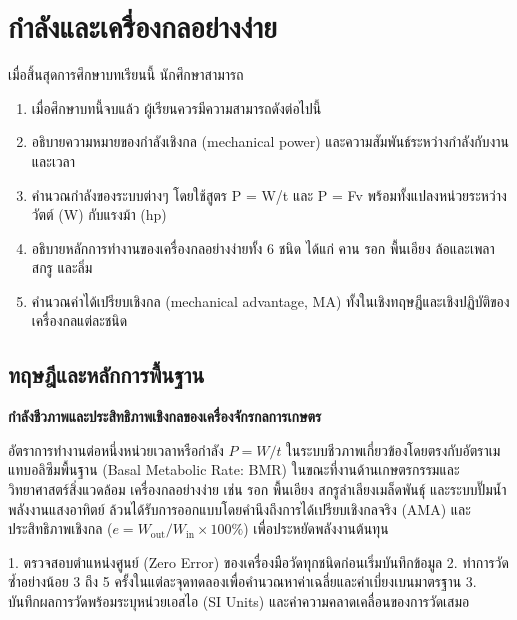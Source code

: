 \chapter{กำลังและเครื่องกลอย่างง่าย}
\label{ch:ch08_power_simple_machines}

\begin{conceptbox}[title=วัตถุประสงค์การเรียนรู้ประจำบท]
เมื่อสิ้นสุดการศึกษาบทเรียนนี้ นักศึกษาสามารถ
\begin{enumerate}
    \item เมื่อศึกษาบทนี้จบแล้ว ผู้เรียนควรมีความสามารถดังต่อไปนี้
    \item อธิบายความหมายของกำลังเชิงกล (mechanical power) และความสัมพันธ์ระหว่างกำลังกับงานและเวลา
    \item คำนวณกำลังของระบบต่างๆ โดยใช้สูตร P = W/t และ P = Fv พร้อมทั้งแปลงหน่วยระหว่างวัตต์ (W) กับแรงม้า (hp)
    \item อธิบายหลักการทำงานของเครื่องกลอย่างง่ายทั้ง 6 ชนิด ได้แก่ คาน รอก พื้นเอียง ล้อและเพลา สกรู และลิ่ม
    \item คำนวณค่าได้เปรียบเชิงกล (mechanical advantage, MA) ทั้งในเชิงทฤษฎีและเชิงปฏิบัติของเครื่องกลแต่ละชนิด
\end{enumerate}
\end{conceptbox}

\section{ทฤษฎีและหลักการพื้นฐาน}

\begin{bioappbox}
\textbf{กำลังชีวภาพและประสิทธิภาพเชิงกลของเครื่องจักรกลการเกษตร}

อัตราการทำงานต่อหนึ่งหน่วยเวลาหรือกำลัง $P = W/t$ ในระบบชีวภาพเกี่ยวข้องโดยตรงกับอัตราเมแทบอลิซึมพื้นฐาน (Basal Metabolic Rate: BMR) ในขณะที่งานด้านเกษตรกรรมและวิทยาศาสตร์สิ่งแวดล้อม เครื่องกลอย่างง่าย เช่น รอก พื้นเอียง สกรูลำเลียงเมล็ดพันธุ์ และระบบปั๊มน้ำพลังงานแสงอาทิตย์ ล้วนได้รับการออกแบบโดยคำนึงถึงการได้เปรียบเชิงกลจริง (AMA) และประสิทธิภาพเชิงกล ($e = W_{\text{out}}/W_{\text{in}} \times 100\%$) เพื่อประหยัดพลังงานต้นทุน
\end{bioappbox}

\begin{labbox}
1. ตรวจสอบตำแหน่งศูนย์ (Zero Error) ของเครื่องมือวัดทุกชนิดก่อนเริ่มบันทึกข้อมูล
2. ทำการวัดซ้ำอย่างน้อย 3 ถึง 5 ครั้งในแต่ละจุดทดลองเพื่อคำนวณหาค่าเฉลี่ยและค่าเบี่ยงเบนมาตรฐาน
3. บันทึกผลการวัดพร้อมระบุหน่วยเอสไอ (SI Units) และค่าความคลาดเคลื่อนของการวัดเสมอ
\end{labbox}

